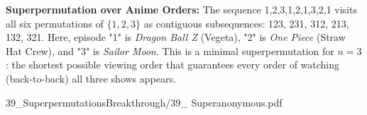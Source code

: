 \begin{SideNotePage}{
  \textbf{Superpermutation over Anime Orders:}  
  The sequence 1,2,3,1,2,1,3,2,1 visits all six permutations of $\{1,2,3\}$ as contiguous subsequences: 123, 231, 312, 213, 132, 321. Here, episode "1" is \emph{Dragon Ball Z} (Vegeta), "2" is \emph{One Piece} (Straw Hat Crew), and "3" is \emph{Sailor Moon}. This is a minimal superpermutation for $n=3$: the shortest possible viewing order that guarantees every order of watching (back-to-back) all three shows appears. \par
  }{39_SuperpermutationsBreakthrough/39_ Superanonymous.pdf}
\end{SideNotePage}
